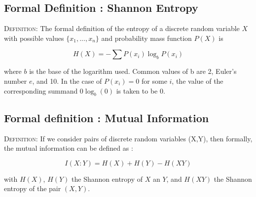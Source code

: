 \documentclass{article}
\begin{document}
\subsection{Formal Definition : Shannon Entropy}
\vspace{2mm}
\begin{flushleft}
\vspace{2mm }
\begin{tcolorbox}
\textsc{Definition:}\cite{wiki-shannon}\newline\newline
The formal definition of the entropy of a discrete random variable $X$ with possible values $\{x_1, ... ,x_n\}$ and probability mass function $P(X)$ is
\vspace{4mm}
\begin{center}
\[
H(X) = - \sum{P(x_i)\log_b P(x_i)}
\]
\end{center}
\vspace{4mm}
where $b$ is the base of the logarithm used. Common values of b are 2, Euler's number $e$, and 10. In the case of $P(x_i) = 0$ for some $i$, the value of the corresponding summand $0\log_b (0)$ is taken to be 0.
\end{tcolorbox}
\end{flushleft}

\subsection{Formal definition : Mutual Information}
\vspace{2mm}
\begin{flushleft}
\vspace{2mm}
\begin{tcolorbox}
\textsc{Definition:}\cite{quantiki}\newline\newline
If we consider pairs of discrete random variables (X,Y), then formally, the mutual information can be defined as :
\begin{center}
\[
I(X : Y) = H(X) + H(Y) - H(XY)
\]
\end{center}
\vspace{2mm}
with $H(X)$, $H(Y)$ the Shannon entropy of $X$ an $Y$, and $H(XY)$ the Shannon entropy of the pair $(X, Y)$. 
\end{tcolorbox}
\end{flushleft}

\newpage
\end{document}
